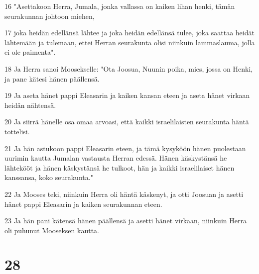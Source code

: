 \par 16 "Asettakoon Herra, Jumala, jonka vallassa on kaiken lihan henki, tämän seurakunnan johtoon miehen,
\par 17 joka heidän edellänsä lähtee ja joka heidän edellänsä tulee, joka saattaa heidät lähtemään ja tulemaan, ettei Herran seurakunta olisi niinkuin lammaslauma, jolla ei ole paimenta".
\par 18 Ja Herra sanoi Moosekselle: "Ota Joosua, Nuunin poika, mies, jossa on Henki, ja pane kätesi hänen päällensä.
\par 19 Ja aseta hänet pappi Eleasarin ja kaiken kansan eteen ja aseta hänet virkaan heidän nähtensä.
\par 20 Ja siirrä hänelle osa omaa arvoasi, että kaikki israelilaisten seurakunta häntä tottelisi.
\par 21 Ja hän astukoon pappi Eleasarin eteen, ja tämä kysyköön hänen puolestaan uurimin kautta Jumalan vastausta Herran edessä. Hänen käskystänsä he lähtekööt ja hänen käskystänsä he tulkoot, hän ja kaikki israelilaiset hänen kanssansa, koko seurakunta."
\par 22 Ja Mooses teki, niinkuin Herra oli häntä käskenyt, ja otti Joosuan ja asetti hänet pappi Eleasarin ja kaiken seurakunnan eteen.
\par 23 Ja hän pani kätensä hänen päällensä ja asetti hänet virkaan, niinkuin Herra oli puhunut Mooseksen kautta.

\chapter{28}

